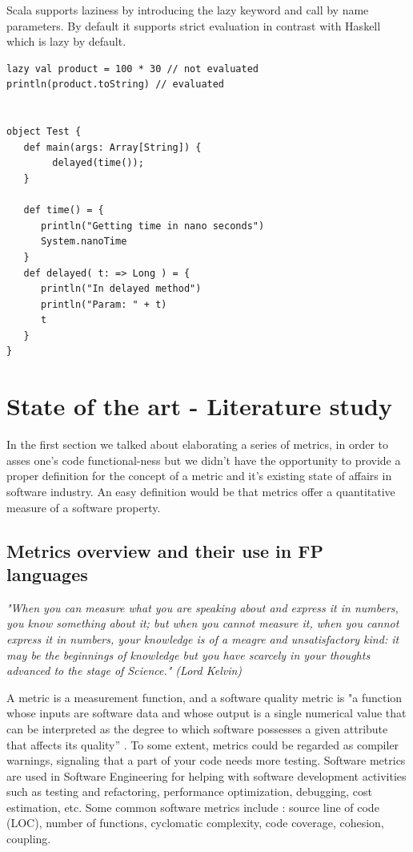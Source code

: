 \documentclass{article}
\begin{document}
Scala supports laziness by introducing the lazy keyword and call by name parameters. By default it supports strict evaluation in contrast with Haskell which is lazy by default.

\begin{lstlisting}
lazy val product = 100 * 30 // not evaluated
println(product.toString) // evaluated 


object Test {
   def main(args: Array[String]) {
        delayed(time());
   }

   def time() = {
      println("Getting time in nano seconds")
      System.nanoTime
   }
   def delayed( t: => Long ) = {
      println("In delayed method")
      println("Param: " + t)
      t
   }
}

\end{lstlisting}

\section {State of the art - Literature study}
In the first section we talked about elaborating a series of metrics, in order to asses one's code functional-ness but we didn't have the opportunity to provide a proper definition for the concept of a metric and it's existing state of affairs in software industry. An easy definition would be that metrics offer a quantitative measure of a software property. 

\subsection{Metrics overview and their use in FP languages}

\textit{"When you can measure what you are speaking about and express it in numbers, you know something about it; but when you cannot measure it, when you cannot express it in numbers, your knowledge is of a meagre and unsatisfactory kind: it may be the beginnings of knowledge but you have scarcely in your thoughts advanced to the stage of Science." (Lord Kelvin)}\par

A metric is a measurement function, and a software quality metric is "a function whose inputs are software data and whose output is a single numerical value that can be interpreted as the degree to which software possesses a given attribute that affects its quality'' \cite{Kaner04softwareengineering}. To some extent, metrics could be regarded as compiler warnings, signaling that a part of your code needs more testing. Software metrics are used in Software Engineering for helping with software development activities such as testing and refactoring, performance optimization, debugging, cost estimation, etc. Some common software metrics include : source line of code (LOC), number of functions, cyclomatic complexity, code coverage, cohesion, coupling. \par
\end{document}
